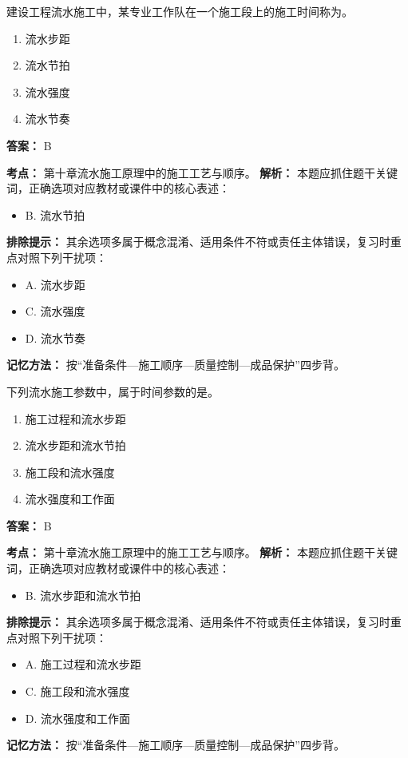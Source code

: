 \documentclass[UTF8,fontset=fandol,11pt]{ctexart}
\begin{document}
\vspace{0.2em}

\begin{quizbox}[title={第 5 题}]
建设工程流水施工中，某专业工作队在一个施工段上的施工时间称为。\\
\begin{enumerate}[label=\Alph*.]
\item 流水步距
\item 流水节拍
\item 流水强度
\item 流水节奏
\end{enumerate}
\textbf{答案：} B
\vspace{0.25em}
\begin{answerbox}[title={考点解析}]
\textbf{考点：} 第十章流水施工原理中的施工工艺与顺序。
\textbf{解析：} 本题应抓住题干关键词，正确选项对应教材或课件中的核心表述：
\begin{itemize}
\item B. 流水节拍
\end{itemize}
\textbf{排除提示：} 其余选项多属于概念混淆、适用条件不符或责任主体错误，复习时重点对照下列干扰项：
\begin{itemize}
\item A. 流水步距
\item C. 流水强度
\item D. 流水节奏
\end{itemize}
\textbf{记忆方法：} 按“准备条件—施工顺序—质量控制—成品保护”四步背。
\end{answerbox}
\end{quizbox}

\vspace{0.2em}

\begin{quizbox}[title={第 6 题}]
下列流水施工参数中，属于时间参数的是。\\
\begin{enumerate}[label=\Alph*.]
\item 施工过程和流水步距
\item 流水步距和流水节拍
\item 施工段和流水强度
\item 流水强度和工作面
\end{enumerate}
\textbf{答案：} B
\vspace{0.25em}
\begin{answerbox}[title={考点解析}]
\textbf{考点：} 第十章流水施工原理中的施工工艺与顺序。
\textbf{解析：} 本题应抓住题干关键词，正确选项对应教材或课件中的核心表述：
\begin{itemize}
\item B. 流水步距和流水节拍
\end{itemize}
\textbf{排除提示：} 其余选项多属于概念混淆、适用条件不符或责任主体错误，复习时重点对照下列干扰项：
\begin{itemize}
\item A. 施工过程和流水步距
\item C. 施工段和流水强度
\item D. 流水强度和工作面
\end{itemize}
\textbf{记忆方法：} 按“准备条件—施工顺序—质量控制—成品保护”四步背。
\end{answerbox}
\end{quizbox}
\end{document}
